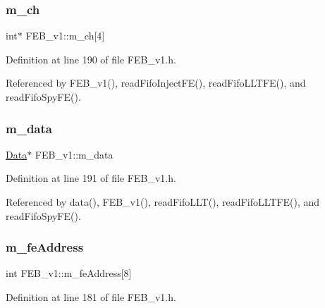 \subsubsection{\texorpdfstring{m\+\_\+ch}{m\_ch}}
{\footnotesize\ttfamily int$\ast$ F\+E\+B\+\_\+v1\+::m\+\_\+ch\mbox{[}4\mbox{]}\hspace{0.3cm}{\ttfamily [private]}}



Definition at line 190 of file F\+E\+B\+\_\+v1.\+h.



Referenced by F\+E\+B\+\_\+v1(), read\+Fifo\+Inject\+F\+E(), read\+Fifo\+L\+L\+T\+F\+E(), and read\+Fifo\+Spy\+F\+E().

\mbox{\label{classFEB__v1_a1c9dbc3660021dba1f58666d0097abb0}} 
\subsubsection{\texorpdfstring{m\+\_\+data}{m\_data}}
{\footnotesize\ttfamily \hyperlink{classData}{Data}$\ast$ F\+E\+B\+\_\+v1\+::m\+\_\+data\hspace{0.3cm}{\ttfamily [private]}}



Definition at line 191 of file F\+E\+B\+\_\+v1.\+h.



Referenced by data(), F\+E\+B\+\_\+v1(), read\+Fifo\+L\+L\+T(), read\+Fifo\+L\+L\+T\+F\+E(), and read\+Fifo\+Spy\+F\+E().

\mbox{\label{classFEB__v1_a4e1945c2d5b434125f375e9d0fc6d99f}} 
\subsubsection{\texorpdfstring{m\+\_\+fe\+Address}{m\_feAddress}}
{\footnotesize\ttfamily int F\+E\+B\+\_\+v1\+::m\+\_\+fe\+Address\mbox{[}8\mbox{]}\hspace{0.3cm}{\ttfamily [private]}}



Definition at line 181 of file F\+E\+B\+\_\+v1.\+h.



